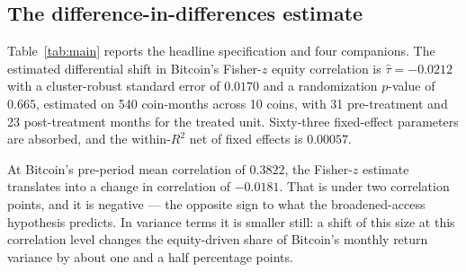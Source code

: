 \documentclass[12pt,a4paper]{article}
\begin{document}
\subsection{The difference-in-differences estimate}

Table~\ref{tab:main} reports the headline specification and four companions. The estimated differential shift in Bitcoin's Fisher-$z$ equity correlation is
$\hat\tau = -0.0212$ with a cluster-robust standard error of $0.0170$ and a randomization $p$-value of
$0.665$, estimated on
540 coin-months across
10 coins, with
31 pre-treatment and
23 post-treatment months for the treated unit.
Sixty-three fixed-effect parameters are absorbed, and
the within-$R^2$ net of fixed effects is $0.00057$.



At Bitcoin's pre-period mean correlation of
$0.3822$, the Fisher-$z$ estimate translates into a change in correlation of
$-0.0181$. That is under two correlation points, and it is negative — the opposite sign to what the broadened-access hypothesis predicts. In variance terms it is smaller still: a shift of this size at this correlation level changes the equity-driven share of Bitcoin's monthly return variance by about one and a half percentage points.
\end{document}
